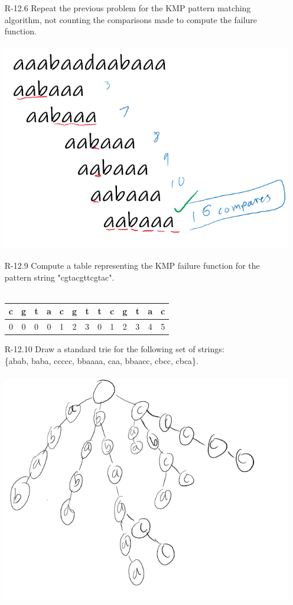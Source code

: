 \begin{itemize}
            \newpage
      \item[R-12.6] Repeat the previous problem for the KMP pattern matching algorithm, not
            counting the comparisons made to compute the failure function.\\
            \answer \\
            \includegraphics[scale = 0.6]{img/R-12_6.png}
      \item[R-12.9] Compute a table representing the KMP failure function for the pattern
            string "cgtacgttcgtac".\\
            \answer \\
            \begin{tabular}{|*{13}{c|}}
                  \hline
                  c & g & t & a & c & g & t & t & c & g & t & a & c \\
                  \hline
                  0 & 0 & 0 & 0 & 1 & 2 & 3 & 0 & 1 & 2 & 3 & 4 & 5 \\
                  \hline
            \end{tabular}
      \item [R-12.10] Draw a standard trie for the following set of strings: \\
            \{abab, baba, ccccc, bbaaaa, caa, bbaacc, cbcc, cbca\}.\\
            \answer \\
            \includegraphics[scale = .7]{img/R-12_10.png}

\end{itemize}
